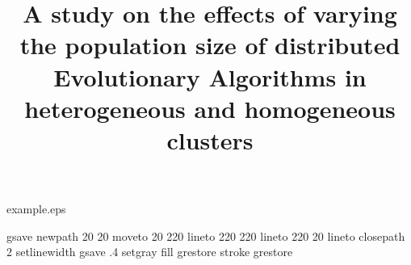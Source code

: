 %
%
%
%
%
\begin{filecontents*}{example.eps}





gsave
newpath
  20 20 moveto
  20 220 lineto
  220 220 lineto
  220 20 lineto
closepath
2 setlinewidth
gsave
  .4 setgray fill
grestore
stroke
grestore
\end{filecontents*}
%
\RequirePackage{fix-cm}
%
\documentclass[twocolumn]{svjour3}          %
%
\smartqed  %
%
\usepackage{graphicx}
\usepackage{color}
\usepackage{listings}
\usepackage{fancyvrb}
\usepackage{url}
\usepackage{fix2col}
\usepackage{natbib}
\usepackage{epsfig}
\usepackage{algorithm}
\usepackage{algorithmic}
%

\lstset{
basicstyle=\ttfamily \scriptsize,
language=java,
frame=single,
stringstyle=\ttfamily,
showstringspaces=false
}

%
%
%
%
%
\providecommand{\e}[1]{\ensuremath{\times 10^{#1}}}


\title{A study on the effects of varying the population size of distributed Evolutionary Algorithms in heterogeneous and homogeneous clusters%
}

